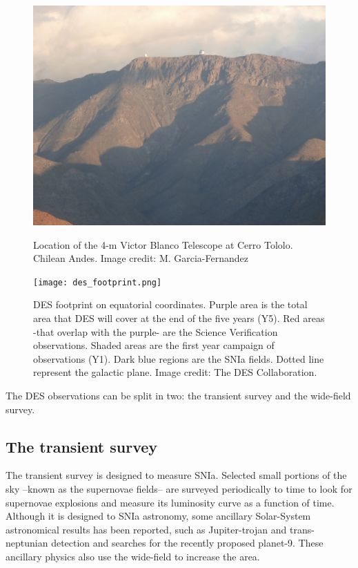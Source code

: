 \begin{figure}
\begin{center}
\includegraphics[width=\textwidth]{./Pictures/cerrotololo_mine.jpg}
\caption{Location of the 4-m Victor Blanco Telescope at Cerro Tololo. Chilean Andes. Image credit: M. Garcia-Fernandez}
\label{fig:cerrotololo}
\vspace{2cm}
\texttt{[image: des\_footprint.png]}
\caption{DES footprint on equatorial coordinates. Purple area is the total area that DES will cover at the end of the five years (Y5). Red areas -that overlap with the purple- are the Science Verification observations. Shaded areas are the first year campaign of observations (Y1). Dark blue regions are the SNIa fields. Dotted line represent the galactic plane. Image credit: The DES Collaboration.}
\label{fig:des_footprint}
\end{center}
\end{figure}

The DES observations can be split in two: the transient survey and the wide-field survey.

\subsection*{The transient survey}
The transient survey is designed to measure SNIa. Selected small portions of the sky --known as the supernovae fields-- are surveyed periodically to time to look for supernovae explosions and measure its luminosity curve as a function of time. Although it is designed to SNIa astronomy, some ancillary Solar-System astronomical results has been reported, such as Jupiter-trojan and trans-neptunian detection and searches for the recently proposed planet-9. These ancillary physics also use the wide-field to increase the area.

